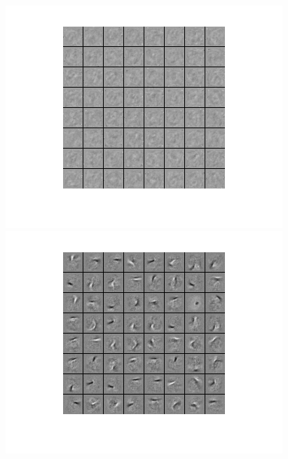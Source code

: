 \documentclass{article} %
\begin{document}
\begin{figure}[ht] 
  \label{fig:filters} 
  \begin{minipage}[b]{0.5\linewidth}
    \centering
    \includegraphics[width=\linewidth]{filters_none_layer1.png} 
    \vspace{4ex}
  \end{minipage}%
  \begin{minipage}[b]{0.5\linewidth}
    \centering
    \includegraphics[width=\linewidth]{filters_random_layer1.png} 
    \vspace{4ex}

\end{minipage}
\end{figure}
\end{document}
